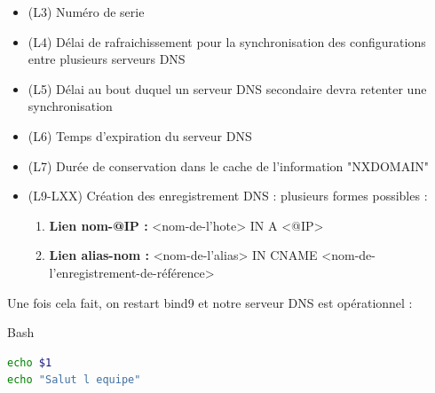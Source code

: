 \documentclass{article}
\begin{document}
\begin{itemize}
	\item (L3) Numéro de serie
	\item (L4) Délai de rafraichissement pour la synchronisation des configurations entre plusieurs serveurs DNS
	\item (L5) Délai au bout duquel un serveur DNS secondaire devra retenter une synchronisation
	\item (L6) Temps d'expiration du serveur DNS
	\item (L7) Durée de conservation dans le cache de l'information "NXDOMAIN"
	\item (L9-LXX) Création des enregistrement DNS : plusieurs formes possibles :
	\begin{enumerate}
		\item \textbf{Lien nom-@IP :}	<nom-de-l'hote>   	IN	A		<@IP>
		\item \textbf{Lien alias-nom :}	<nom-de-l'alias> 	IN	CNAME 	<nom-de-l'enregistrement-de-référence>
	\end{enumerate}		  
\end{itemize}

Une fois cela fait, on restart bind9 et notre serveur DNS est opérationnel :

\begin{codebox}{Bash}
\begin{lstlisting}[language=Bash]
echo $1
echo "Salut l equipe"

\end{lstlisting}
\end{codebox}
\end{document}
